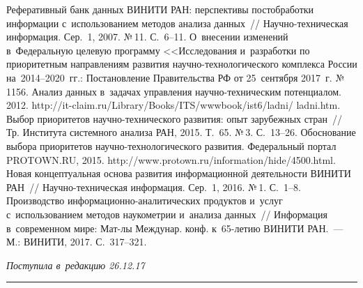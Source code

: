 \begin{multicols}{2}
{{\begin{thebibliography}{99}
 Реферативный банк данных 
ВИНИТИ РАН: перспективы постобработки информации с~использованием 
методов анализа данных~// На\-уч\-но-тех\-ни\-че\-ская информация. Сер.~1, 
2007. №\,11. С.~6--11.
О~внесении изменений в~Федеральную целевую программу <<Исследования 
и~разработки по приори\-тетным направлениям развития  
на\-уч\-но-тех\-но\-ло\-гическо\-го комплекса России на~2014--2020~гг.: 
Постанов\-ле\-ние Правительства РФ от 25~сентября 2017~г. №\,1156.
 Анализ данных в~задачах управ\-ле\-ния  
на\-уч\-но-тех\-ни\-че\-ским потенциалом. 2012. {\sf  
http://\linebreak it-claim.ru/Library/Books/ITS/wwwbook/ist6/ladni/ ladni.htm}. 
Выбор приоритетов на\-уч\-но-тех\-ни\-че\-ско\-го развития: опыт зарубежных 
стран~// Тр. Института системного анализа РАН, 2015. Т.~65. №\,3. С.~13--26.
Обоснование выбора приоритетов на\-уч\-но-тех\-но\-ло\-ги\-че\-ско\-го 
развития. Федеральный портал PROTOWN.RU,  2015. {\sf 
http://www.protown.ru/\linebreak information/hide/4500.html}. 
 Новая 
концептуальная основа развития информационной деятельности ВИНИТИ 
РАН~// На\-уч\-но-тех\-ни\-че\-ская информация. Сер.~1, 2016. №\,1. С.~1--8. 
 Производство  
ин\-фор\-ма\-ци\-он\-но-ана\-ли\-ти\-че\-ских продуктов и~услуг 
с~использованием методов наукометрии и~анализа данных~// Информация 
в~современном мире: Мат-лы Междунар. конф. к~65-ле\-тию ВИНИТИ  
РАН.~--- М.: ВИНИТИ, 2017. С.~317--321.
  \end{thebibliography}

 }
 }

\end{multicols}

\vspace*{-6pt}

\hfill{\small\textit{Поступила в~редакцию 26.12.17}}

\vspace*{8pt}



\hrule

\vspace*{2pt}

